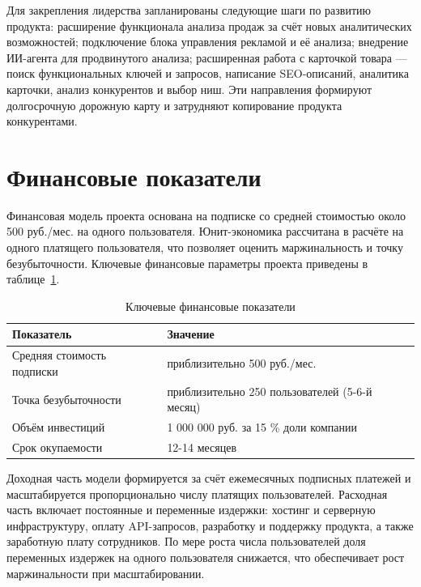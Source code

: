 Для закрепления лидерства запланированы следующие шаги по развитию продукта: расширение функционала анализа продаж за счёт новых аналитических возможностей; подключение блока управления рекламой и её анализа; внедрение ИИ-агента для продвинутого анализа; расширенная работа с карточкой товара --- поиск функциональных ключей и запросов, написание SEO-описаний, аналитика карточки, анализ конкурентов и выбор ниш. Эти направления формируют долгосрочную дорожную карту и затрудняют копирование продукта конкурентами.

\section{Финансовые показатели}

Финансовая модель проекта основана на подписке со средней стоимостью около 500 руб./мес. на одного пользователя. Юнит-экономика рассчитана в расчёте на одного платящего пользователя, что позволяет оценить маржинальность и точку безубыточности. Ключевые финансовые параметры проекта приведены в таблице~\ref{tab:finance}.

\begin{table}[H]
\caption{Ключевые финансовые показатели}
\label{tab:finance}
\begin{center}
\vspace{-0.5cm}\begin{tabular}{|p{5cm}|p{10.5cm}|}
\hline
Показатель & Значение \\ \hline
Средняя стоимость подписки & приблизительно 500 руб./мес. \\ \hline
Точка безубыточности & приблизительно 250 пользователей (5-6-й месяц) \\ \hline
Объём инвестиций & 1 000 000 руб. за 15 \% доли компании \\ \hline
Срок окупаемости & 12-14 месяцев \\ \hline
\end{tabular}
\end{center}
\end{table}

Доходная часть модели формируется за счёт ежемесячных подписных платежей и масштабируется пропорционально числу платящих пользователей. Расходная часть включает постоянные и переменные издержки: хостинг и серверную инфраструктуру, оплату API-запросов, разработку и поддержку продукта, а также заработную плату сотрудников. По мере роста числа пользователей доля переменных издержек на одного пользователя снижается, что обеспечивает рост маржинальности при масштабировании.

